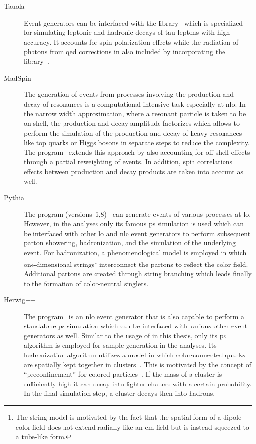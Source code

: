 \begin{description}
\item[Tauola] Event generators can be interfaced with the \TAUOLA[format=hyperbf] library~\cite{Jadach:1993hs,Davidson:2010rw} which is specialized for simulating leptonic and hadronic decays of tau leptons with high accuracy. It accounts for spin polarization effects while the radiation of photons from \gls{qed} corrections in also included by incorporating the \PHOTOS[format=hyperbf] library~\cite{Golonka:2005pn}.

\item[MadSpin] The generation of events from processes involving the production and decay of resonances is a computational-intensive task especially at \gls{nlo}. In the narrow width approximation, where a resonant particle is taken to be on-shell, the production and decay amplitude factorizes which allows to perform the simulation of the production and decay of heavy resonances like top quarks or Higgs bosons in separate steps to reduce the complexity. The \MADSPIN[format=hyperbf] program~\cite{Artoisenet:2012st} extends this approach by also accounting for off-shell effects through a partial reweighting of events. In addition, spin correlations effects between production and decay products are taken into account as well.

\item[Pythia] The \PYTHIA[format=hyperbf] program (versions~6,8)~\cite{Sjostrand:2006za,Sjostrand:2014zea} can generate events of various processes at \gls{lo}. However, in the analyses only its famous \gls{ps} simulation is used which can be interfaced with other \gls{lo} and \gls{nlo} event generators to perform subsequent parton showering, hadronization, and the simulation of the underlying event. For hadronization, a phenomenological model is employed in which one-dimensional strings\footnote{The string model is motivated by the fact that the spatial form of a dipole color field does not extend radially like an \gls{em} field but is instead squeezed to a tube-like form.} interconnect the partons to reflect the color field. Additional partons are created through string branching which leads finally to the formation of color-neutral singlets.

\item[Herwig++] The \HERWIG[format=hyperbf] program~\cite{Bahr:2008pv,Bellm:2015jjp} is an \gls{nlo} event generator that is also capable to perform a standalone \gls{ps} simulation which can be interfaced with various other event generators as well. Similar to the usage of \PYTHIA in this thesis, only its \gls{ps} algorithm is employed for sample generation in the analyses. Its hadronization algorithm utilizes a model in which color-connected quarks are spatially kept together in clusters~\cite{Webber:1983if}. This is motivated by the concept of ``preconfinement'' for colored particles~\cite{Amati:1979fg}. If the mass of a cluster is sufficiently high it can decay into lighter clusters with a certain probability. In the final simulation step, a cluster decays then into hadrons.
\end{description}


